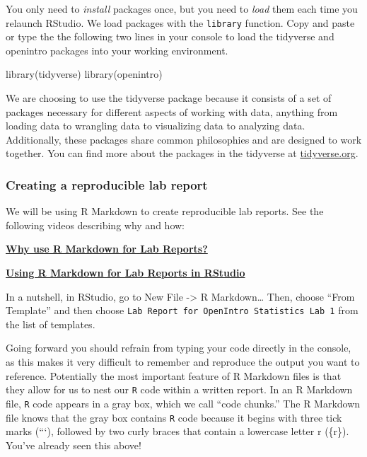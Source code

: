 \documentclass[
]{article}
\newenvironment{Shaded}{\begin{snugshade}}{\end{snugshade}}
\newcommand{\FunctionTok}[1]{\textcolor[rgb]{0.00,0.00,0.00}{#1}}
\newcommand{\NormalTok}[1]{#1}
\begin{document}
You only need to \emph{install} packages once, but you need to \emph{load} them each time you relaunch RStudio. We load packages with the \texttt{library} function. Copy and paste or type the the following two lines in your console to load the tidyverse and openintro packages into your working environment.

\begin{Shaded}
\begin{Highlighting}[]
\FunctionTok{library}\NormalTok{(tidyverse)}
\FunctionTok{library}\NormalTok{(openintro)}
\end{Highlighting}
\end{Shaded}

We are choosing to use the tidyverse package because it consists of a set of packages necessary for different aspects of working with data, anything from loading data to wrangling data to visualizing data to analyzing data. Additionally, these packages share common philosophies and are designed to work together. You can find more about the packages in the tidyverse at \href{http://tidyverse.org/}{tidyverse.org}.

\hypertarget{creating-a-reproducible-lab-report}{%
\subsubsection{Creating a reproducible lab report}\label{creating-a-reproducible-lab-report}}

We will be using R Markdown to create reproducible lab reports. See the following videos describing why and how:

\href{https://youtu.be/lNWVQ2oxNho}{\textbf{Why use R Markdown for Lab Reports?}}

\href{https://youtu.be/o0h-eVABe9M}{\textbf{Using R Markdown for Lab Reports in RStudio}}

In a nutshell, in RStudio, go to New File -\textgreater{} R Markdown\ldots{} Then, choose ``From Template'' and then choose \texttt{Lab\ Report\ for\ OpenIntro\ Statistics\ Lab\ 1} from the list of templates.

Going forward you should refrain from typing your code directly in the console, as this makes it very difficult to remember and reproduce the output you want to reference. Potentially the most important feature of R Markdown files is that they allow for us to nest our \texttt{R} code within a written report. In an R Markdown file, \texttt{R} code appears in a gray box, which we call ``code chunks.'' The R Markdown file knows that the gray box contains \texttt{R} code because it begins with three tick marks (```), followed by two curly braces that contain a lowercase letter r (\{r\}). You've already seen this above!
\end{document}

